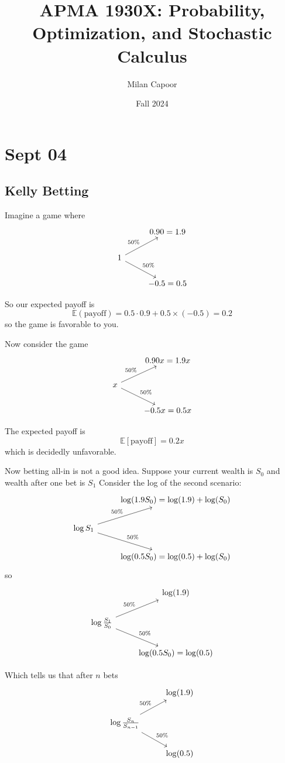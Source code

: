 \documentclass[12pt]{article}
\title{APMA 1930X: Probability, Optimization, and Stochastic Calculus}
\author{Milan Capoor}
\date{Fall 2024}
\newcommand{\E}{\mathbb{E}}
\begin{document}
\maketitle
\section*{Sept 04}
\subsection*{Kelly Betting}
    Imagine a game where 
    \[\begin{tikzcd}
        & 0.90 = 1.9\\ 
        1 \arrow[ur, "50\%"] \arrow[dr, "50\%"]&\\
        & -0.5 = 0.5
    \end{tikzcd}\]  

    So our expected payoff is 
    \[\E(\text{payoff}) = 0.5\cdot 0.9 + 0.5 \times (-0.5) = 0.2\]
    so the game is favorable to you. 

    Now consider the game 
    \[\begin{tikzcd}
        & 0.90x = 1.9x\\ 
        x \arrow["50\%"]{ur} \arrow["50\%"]{dr} &\\
        & -0.5x = 0.5x
    \end{tikzcd}\] 

    The expected payoff is
    \[\E[\text{payoff}] = 0.2x\]
    which is decidedly unfavorable. 

    Now betting all-in is not a good idea. Suppose your current wealth is $S_0$ and wealth after one bet is $S_1$ Consider the log of the second scenario:
    \[\begin{tikzcd}
        & \log(1.9 S_0) = \log(1.9) + \log(S_0)\\ 
        \log S_1 \arrow["50\%"]{ur} \arrow["50\%"]{dr}  &\\
        &  \log(0.5 S_0) = \log(0.5) + \log(S_0)
    \end{tikzcd}\]
    so 
    \[\begin{tikzcd}
        & \log(1.9)\\ 
        \log \frac{S_1}{S_0} \arrow["50\%"]{ur} \arrow["50\%"]{dr}  &\\
        &  \log(0.5 S_0) = \log(0.5)
    \end{tikzcd}\]

    Which tells us that after $n$ bets  
    \[\begin{tikzcd}
        & \log(1.9)\\ 
        \log \frac{S_n}{S_{n-1}} \arrow["50\%"]{ur} \arrow["50\%"]{dr}  &\\
        & \log(0.5)
    \end{tikzcd}\]
\end{document}
